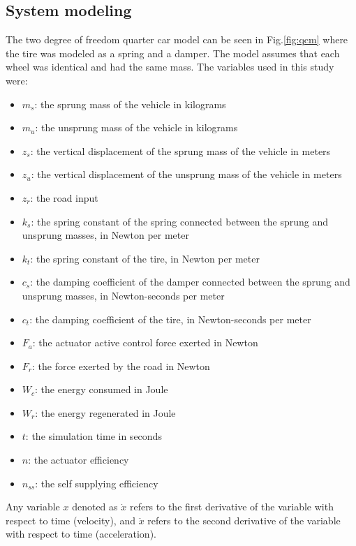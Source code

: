 \subsection{System modeling}
The two degree of freedom quarter car model can be seen in Fig.\:\ref{fig:qcm} where the tire was modeled as a spring and a damper\:\cite{azmiNovelOptimalControl2023}. The model assumes that each wheel was identical and had the same mass. The variables used in this study were:
\begin{itemize}
    \item $m_s$: the sprung mass of the vehicle in kilograms
    \item $m_u$: the unsprung mass of the vehicle in kilograms
    \item $z_s$: the vertical displacement of the sprung mass of the vehicle in meters
    \item $z_u$: the vertical displacement of the unsprung mass of the vehicle in meters
    \item $z_r$: the road input
    \item $k_s$: the spring constant of the spring connected between the sprung and unsprung masses, in Newton per meter
    \item $k_t$: the spring constant of the tire, in Newton per meter
    \item $c_s$: the damping coefficient of the damper connected between the sprung and unsprung masses, in Newton-seconds per meter
    \item $c_t$: the damping coefficient of the tire, in Newton-seconds per meter
    \item $F_a$: the actuator active control force exerted in Newton
    \item $F_r$: the force exerted by the road in Newton
    \item $W_c$: the energy consumed in Joule
    \item $W_r$: the energy regenerated in Joule
    \item $t$: the simulation time in seconds
    \item $n$: the actuator efficiency
    \item $n_{ss}$: the self supplying efficiency
\end{itemize}
Any variable $x$ denoted as $\dot{x}$ refers to the first derivative of the variable with respect to time (velocity), and $\ddot{x}$ refers to the second derivative of the variable with respect to time (acceleration).

